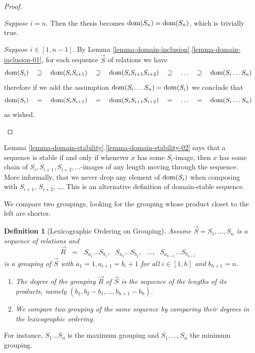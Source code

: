 \documentclass{lmcs}
\newtheorem{definition}[theorem]{Definition}
\begin{document}
\begin{proof}
\begin{enumerate}
\emph{Suppose $i=n$}. 
Then the thesis becomes ${\rm dom}(S_n) =  {\rm dom}(S_n)$, which is trivially true.

\emph{Suppose $i \in [1,n-1]$}.
By Lemma \ref{lemma-domain-inclusion}.\ref{lemma-domain-inclusion-01},
for each sequence $\vec{S}$ of relations we have 
$$
\dom(S_i)  \ \ \ \supseteq \ \ \ 
\dom(S_iS_{i+1})  \ \ \  \supseteq \ \ \ 
\dom(S_iS_{i+1}S_{i+2})  \ \ \  \supseteq  \ \ \ 
\ldots  \ \ \  \supseteq  \ \ \ 
\dom(S_i \ldots S_n)
$$ 
therefore if we add the assumption ${\rm dom}(S_i \ldots S_n) = {\rm dom}(S_i)$ we conclude that
$$
\dom(S_i)   \ \ \ =  \ \ \ 
\dom(S_iS_{i+1})  \ \ \  =  \ \ \ 
\dom(S_iS_{i+1}S_{i+2})   \ \ \ =  \ \ \ 
\ldots   \ \ \ =  \ \ \ 
\dom(S_i \ldots S_n)
$$ 
as wished.
 
\end{enumerate}
\end{proof}

Lemma \ref{lemma-domain-stability}.\ref{lemma-domain-stability-02}
says that a sequence is stable if and only if whenever $x$ has some $S_i$-image,
then $x$ has some chain of $S_i, S_{i+1}, S_{i+2}, \ldots$-images of any length
moving through the sequence. More informally, that we never drop any element of ${\rm dom}(S_i)$
when composing with $S_{i+1}$, $S_{i+2}$, \ldots.
This is an alternative definition of domain-stable sequence.

We compare two groupings, looking for the grouping whose product closet to the left 
are shorter.

\begin{definition}[Lexicographic Ordering on Grouping]
\label{definition-grouping-order}
Assume $\vec{S}=S_1, \ldots, S_n$ is a sequence of relations and 
$$
\vec{R} \ \ \ = \ \ \ 
S_{a_1} \ldots S_{b_1}, \ \ \ S_{a_2} \ldots S_{b_2}, \ \ \ \ldots, \ \ \ S_{a_{h+1}} \ldots S_{b_{h+1}}
$$
is a grouping of $\vec{S}$ with $a_1=1, a_{i+1} = b_i+1$ for all $i \in [1,h]$ and 
$b_{h+1} = n$.

\begin{enumerate}
\item
The degree of the grouping $\vec{R}$ of $\vec{S}$ is the sequence
of the lengths of its products, namely $(b_1, b_2 - b_1, \ldots, b_{h+1} - b_h)$. 
\item
We compare two grouping of the same sequence by comparing their degrees in the 
lexicographic ordering.
\end{enumerate}
\end{definition} 

For instance, 
$S_1 \ldots S_n$ is the maximum grouping and $S_1, \ldots, S_n$ the minimum grouping.
\end{document}
